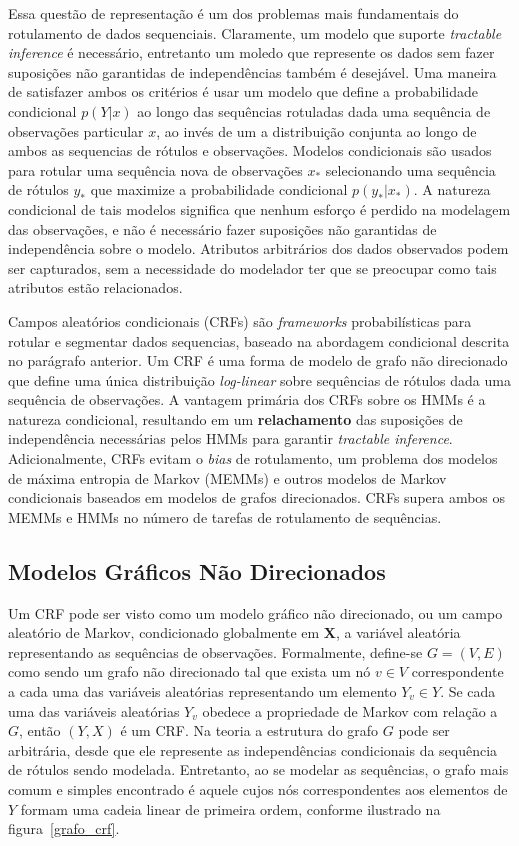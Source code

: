 Essa questão de representação é um dos problemas mais fundamentais do rotulamento de
dados sequenciais. Claramente, um modelo que suporte \textit{tractable inference} é
necessário, entretanto um moledo que represente os dados sem fazer suposições não
garantidas de independências também é desejável. Uma maneira de satisfazer ambos os
critérios é usar um modelo que define a probabilidade condicional $p(Y|x)$ ao longo
das sequências rotuladas dada uma sequência de observações particular $x$, ao invés de
um a distribuição conjunta ao longo de ambos as sequencias de rótulos e observações.
Modelos condicionais são usados para rotular uma sequência nova de observações $x_*$
selecionando uma sequência de rótulos $y_*$ que maximize a probabilidade condicional
$p(y_*|x_*)$. A natureza condicional de tais modelos significa que nenhum esforço é
perdido na modelagem das observações, e não é necessário fazer suposições não
garantidas de independência sobre o modelo. Atributos arbitrários dos dados observados
podem ser capturados, sem a necessidade do modelador ter que se preocupar como tais
atributos estão relacionados.

Campos aleatórios condicionais (CRFs) são \textit{frameworks} probabilísticas para
rotular e segmentar dados sequencias, baseado na abordagem condicional descrita no
parágrafo anterior. Um CRF é uma forma de modelo de grafo não direcionado que define
uma única distribuição \textit{log-linear} sobre sequências de rótulos dada uma
sequência de observações. A vantagem primária dos CRFs sobre os HMMs é a natureza
condicional, resultando em um \textbf{relachamento} das suposições de independência
necessárias pelos HMMs para garantir \textit{tractable inference}. Adicionalmente,
CRFs evitam o \textit{bias} de rotulamento, um problema dos modelos de máxima entropia
de Markov (MEMMs) e outros modelos de Markov condicionais baseados em modelos de grafos
direcionados. CRFs supera ambos os MEMMs e HMMs no número de tarefas de rotulamento de
sequências.

\subsection{Modelos Gráficos Não Direcionados}

Um CRF pode ser visto como um modelo gráfico não direcionado, ou um campo aleatório
de Markov, condicionado globalmente em \textbf{X}, a variável aleatória representando
as sequências de observações. Formalmente, define-se $G=(V,E)$ como sendo um
grafo não direcionado tal que exista um nó $v \in V$ correspondente a cada uma das
variáveis aleatórias representando um elemento $Y_v \in Y$. Se cada uma das variáveis
aleatórias $Y_v$ obedece a propriedade de Markov com relação a $G$, então $(Y,X)$ é
um CRF\@. Na teoria a estrutura do grafo $G$ pode ser arbitrária, desde que ele represente
as independências condicionais da sequência de rótulos sendo modelada. Entretanto,
ao se modelar as sequências, o grafo mais comum e simples encontrado é aquele cujos nós
correspondentes aos elementos de $Y$ formam uma cadeia linear de primeira ordem, conforme
ilustrado na figura~\ref{grafo_crf}.

